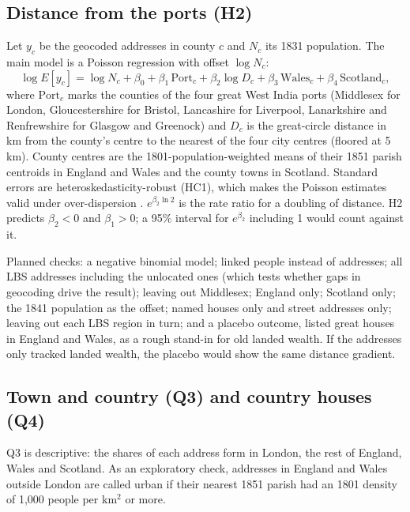 \documentclass[11pt,a4paper]{article}
\begin{document}
\subsection{Distance from the ports (H2)}
Let $y_c$ be the geocoded addresses in county $c$ and $N_c$ its 1831 population. The main model is a Poisson regression with offset $\log N_c$:
\begin{equation}
\log E[y_c] = \log N_c + \beta_0 + \beta_1\,\mathrm{Port}_c + \beta_2 \log D_c + \beta_3\,\mathrm{Wales}_c + \beta_4\,\mathrm{Scotland}_c,
\end{equation}
where $\mathrm{Port}_c$ marks the counties of the four great West India ports (Middlesex for London, Gloucestershire for Bristol, Lancashire for Liverpool, Lanarkshire and Renfrewshire for Glasgow and Greenock) and $D_c$ is the great-circle distance in km from the county's centre to the nearest of the four city centres (floored at 5 km). County centres are the 1801-population-weighted means of their 1851 parish centroids in England and Wales \citep{caprettini2020} and the county towns in Scotland. Standard errors are heteroskedasticity-robust (HC1), which makes the Poisson estimates valid under over-dispersion \citep{santossilva2006,cameron2013}. $e^{\beta_2 \ln 2}$ is the rate ratio for a doubling of distance. H2 predicts $\beta_2<0$ and $\beta_1>0$; a 95\% interval for $e^{\beta_2}$ including 1 would count against it.

Planned checks: a negative binomial model; linked people instead of addresses; all LBS addresses including the unlocated ones (which tests whether gaps in geocoding drive the result); leaving out Middlesex; England only; Scotland only; the 1841 population as the offset; named houses only and street addresses only; leaving out each LBS region in turn; and a placebo outcome, listed great houses in England and Wales, as a rough stand-in for old landed wealth. If the addresses only tracked landed wealth, the placebo would show the same distance gradient.

\subsection{Town and country (Q3) and country houses (Q4)}\label{sec:listed}
Q3 is descriptive: the shares of each address form in London, the rest of England, Wales and Scotland. As an exploratory check, addresses in England and Wales outside London are called urban if their nearest 1851 parish had an 1801 density of 1,000 people per km$^2$ or more.
\end{document}
